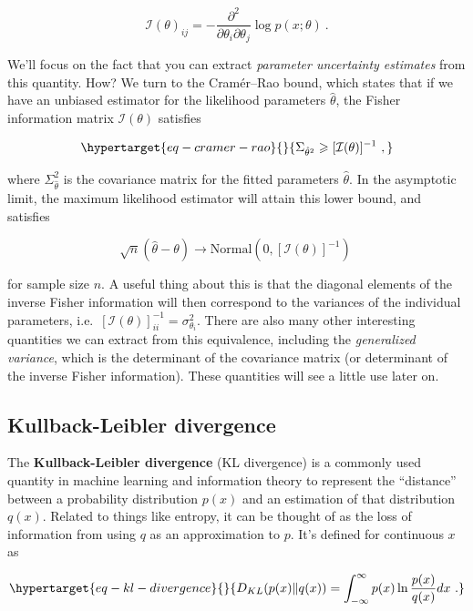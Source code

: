 \documentclass[
  11pt,
  numbers=noendperiod]{book}
\begin{document}
\[
\mathcal{I}(\theta)_{ij}=-\frac{\partial^2}{\partial \theta_i \partial \theta_j} \log p(x ; \theta)~.
\]

We'll focus on the fact that you can extract \emph{parameter uncertainty
estimates} from this quantity. How? We turn to the Cramér--Rao bound,
which states that if we have an unbiased estimator for the likelihood
parameters \(\hat{\theta}\), the Fisher information matrix
\(\mathcal{I}(\theta)\) satisfies

\begin{equation}\protect\hypertarget{eq-cramer-rao}{}{
\Sigma_{\hat{\theta}^2} \geqslant [\mathcal{I}(\theta)]^{-1}~,
}\label{eq-cramer-rao}\end{equation}

where \(\Sigma_{\hat{\theta}}^2\) is the covariance matrix for the
fitted parameters \(\hat{\theta}\). In the asymptotic limit, the maximum
likelihood estimator will attain this lower bound, and satisfies

\[
\sqrt{n}(\hat{\theta}-\theta) \rightarrow \text{Normal}(0, [\mathcal{I}(\theta)]^{-1})~
\]

for sample size \(n\). A useful thing about this is that the diagonal
elements of the inverse Fisher information will then correspond to the
variances of the individual parameters,
i.e.~\([\mathcal{I}(\theta)]^{-1}_{ii} = \sigma_{\theta_i}^2\). There
are also many other interesting quantities we can extract from this
equivalence, including the \emph{generalized variance}, which is the
determinant of the covariance matrix (or determinant of the inverse
Fisher information). These quantities will see a little use later on.

\hypertarget{sec-KL}{%
\subsection{Kullback-Leibler divergence}\label{sec-KL}}

The \textbf{Kullback-Leibler divergence} (KL divergence) is a commonly
used quantity in machine learning and information theory to represent
the ``distance'' between a probability distribution \(p(x)\) and an
estimation of that distribution \(q(x)\). Related to things like
entropy, it can be thought of as the loss of information from using
\(q\) as an approximation to \(p\). It's defined for continuous \(x\) as

\begin{equation}\protect\hypertarget{eq-kl-divergence}{}{
D_{KL}(p(x) \| q(x))=\int_{-\infty}^{\infty} p(x) \ln \frac{p(x)}{q(x)} dx~.
}\label{eq-kl-divergence}\end{equation}
\end{document}
